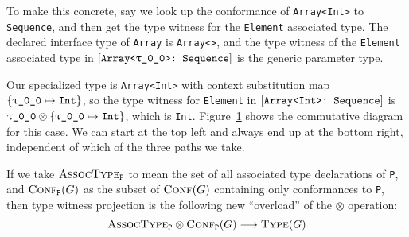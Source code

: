 \documentclass[../generics]{subfiles}
\begin{document}
\begin{example}
To make this concrete, say we look up the conformance of \texttt{Array<Int>} to \texttt{Sequence}, and then get the type witness for the \texttt{Element} associated type. The declared interface type of \texttt{Array} is \texttt{Array<>}, and the type witness of the \texttt{Element} associated type in $[\texttt{Array<\texttt{$\uptau$\_0\_0}>:~Sequence}]$ is the  generic parameter type.

Our specialized type is \texttt{Array<Int>} with context substitution map $\{\texttt{\texttt{$\uptau$\_0\_0}} \mapsto \texttt{Int}\}$, so the type witness for \texttt{Element} in $[\texttt{Array<Int>:~Sequence}]$ is $\texttt{$\uptau$\_0\_0}\otimes\{\texttt{\texttt{$\uptau$\_0\_0}} \mapsto \texttt{Int}\}$, which is \texttt{Int}. Figure~\ref{type witness diagram example} shows the commutative diagram for this case. We can start at the top left and always end up at the bottom right, independent of which of the three paths we take.
\begin{figure}\label{type witness diagram example}
\begin{center}
\end{center}
\end{figure}
\end{example}

If we take $\textsc{AssocType}_{\texttt{P}}$ to mean the set of all associated type declarations of \texttt{P}, and $\textsc{Conf}_{\texttt{P}}({G})$ as the subset of $\textsc{Conf}({G})$ containing only conformances to \texttt{P}, then type witness projection is the following new ``overload'' of the \index{$\otimes$}$\otimes$ operation:
\[\textsc{AssocType}_{\texttt{P}}\otimes\textsc{Conf}_{\texttt{P}}({G})\longrightarrow\textsc{Type}({G})\]
\end{document}
